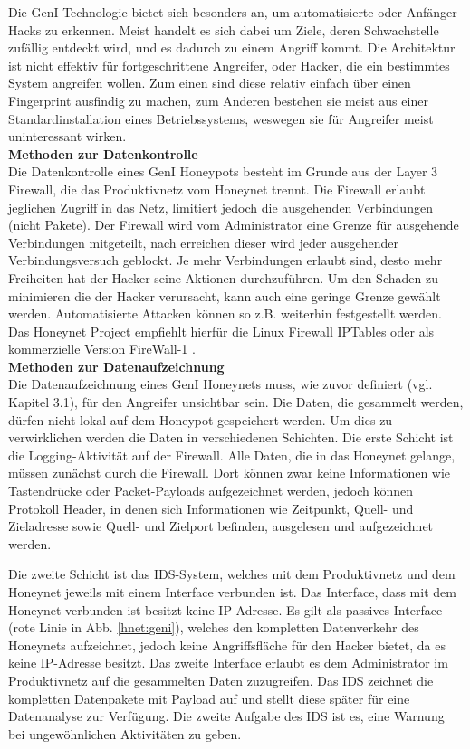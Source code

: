 \noindent Die GenI Technologie bietet sich besonders an, um automatisierte oder Anfänger-Hacks zu erkennen. Meist handelt es sich dabei um Ziele, deren Schwachstelle zufällig entdeckt wird, und es dadurch zu einem Angriff kommt. 
Die Architektur ist nicht effektiv für fortgeschrittene Angreifer, oder Hacker, die ein bestimmtes System angreifen wollen. Zum einen sind diese relativ einfach über einen Fingerprint ausfindig zu machen, zum Anderen bestehen sie meist aus einer Standardinstallation eines Betriebssystems, weswegen sie für Angreifer meist uninteressant wirken\cite{spitzner.2002a}.\\

\noindent\textbf{Methoden zur Datenkontrolle}\\
\noindent Die Datenkontrolle eines GenI Honeypots besteht im Grunde aus der Layer 3 Firewall, die das Produktivnetz vom Honeynet trennt. Die Firewall erlaubt jeglichen Zugriff in das Netz, limitiert jedoch die ausgehenden Verbindungen (nicht Pakete). Der Firewall wird vom Administrator eine Grenze für ausgehende Verbindungen mitgeteilt, nach erreichen dieser wird jeder ausgehender Verbindungsversuch geblockt. Je mehr Verbindungen erlaubt sind, desto mehr Freiheiten hat der Hacker seine Aktionen durchzuführen. Um den Schaden zu minimieren die der Hacker verursacht, kann auch eine geringe Grenze gewählt werden. Automatisierte Attacken können so z.B. weiterhin festgestellt werden. Das Honeynet Project empfiehlt hierfür die Linux Firewall IPTables oder als kommerzielle Version FireWall-1 \cite{spitzner.2002a}.\\

\noindent\textbf{Methoden zur Datenaufzeichnung}\\
\noindent Die Datenaufzeichnung eines GenI Honeynets muss, wie zuvor definiert (vgl. Kapitel 3.1), für den Angreifer unsichtbar sein. Die Daten, die gesammelt werden, dürfen nicht lokal auf dem Honeypot gespeichert werden. Um dies zu verwirklichen werden die Daten in verschiedenen Schichten.
Die erste Schicht ist die Logging-Aktivität auf der Firewall. Alle Daten, die in das Honeynet gelange, müssen zunächst durch die Firewall. Dort können zwar keine Informationen wie Tastendrücke oder Packet-Payloads aufgezeichnet werden, jedoch können Protokoll Header, in denen sich Informationen wie Zeitpunkt, Quell- und Zieladresse sowie Quell- und Zielport befinden, ausgelesen und aufgezeichnet werden\cite{spitzner.2002a}. 

Die zweite Schicht ist das IDS-System, welches mit dem Produktivnetz und dem Honeynet jeweils mit einem Interface verbunden ist. Das Interface, dass mit dem Honeynet verbunden ist besitzt keine IP-Adresse. Es gilt als passives Interface (rote Linie in Abb. \ref{hnet:geni}), welches den kompletten Datenverkehr des Honeynets aufzeichnet, jedoch keine Angriffsfläche für den Hacker bietet, da es keine IP-Adresse besitzt. Das zweite Interface erlaubt es dem Administrator im Produktivnetz auf die gesammelten Daten zuzugreifen. Das IDS zeichnet die kompletten Datenpakete mit Payload auf und stellt diese später für eine Datenanalyse zur Verfügung. Die zweite Aufgabe des IDS ist es, eine Warnung bei ungewöhnlichen Aktivitäten zu geben\cite{spitzner.2002a}.


